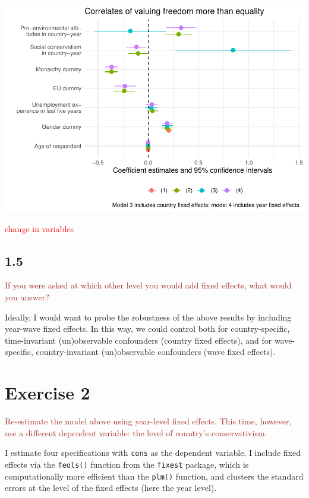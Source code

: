 \documentclass[
]{article}
\begin{document}
\includegraphics{AVCD-Assignment3-Edenhofer_files/figure-latex/year-fe-free-better-1.pdf}

\textcolor{red}{change in variables}

\hypertarget{section-4}{%
\subsection{1.5}\label{section-4}}

\textcolor{brown}{If you were asked at which other level you would add fixed effects, what would you answer?}

Ideally, I would want to probe the robustness of the above results by
including year-wave fixed effects. In this way, we could control both
for country-specific, time-invariant (un)observable confounders (country
fixed effects), and for wave-specific, country-invariant (un)observable
confounders (wave fixed effects).

\hypertarget{exercise-2}{%
\section{Exercise 2}\label{exercise-2}}

\textcolor{brown}{Re-estimate the model above using year-level fixed effects. This time, however, use a different dependent variable: the level of country’s conservativism.}

I estimate four specifications with \texttt{cons} as the dependent
variable. I include fixed effects via the \texttt{feols()} function from
the \texttt{fixest} package, which is computationally more efficient
than the \texttt{plm()} function, and clusters the standard errors at
the level of the fixed effects (here the year level).
\end{document}
